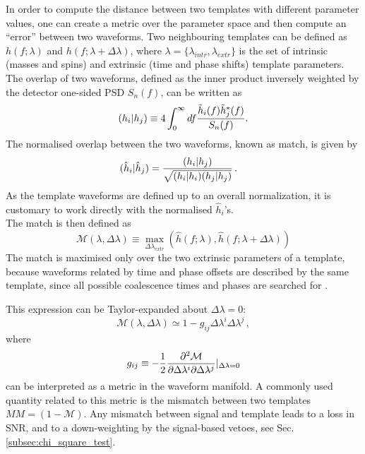 \documentclass[binding=0.6cm, LaM]{sapthesis}
\begin{document}
	In order to compute the distance between two templates with different parameter values, 
	one can create a metric over the parameter space and then compute an ``error'' between two waveforms.
	Two neighbouring templates can be defined as $h(f;\lambda)$ and $h(f;\lambda + \Delta \lambda)$,
        where $\lambda = \{\lambda_{intr}, \lambda_{extr}\}$ is the set of
        intrinsic (masses and spins) and extrinsic (time and phase shifts) template parameters.
	The overlap of two waveforms, defined as the inner product inversely weighted by the detector one-sided  PSD $S_n(f)$, 
	can be written as  
        \begin{equation}
          (h_i| h_j)  \equiv 4 \int_{0}^{\infty} df {{\tilde h_i(f) \tilde h^*_j(f)} \over {S_n(f)}}.
        \end{equation}
	The normalised overlap between the two waveforms, known as match, is given by
        \begin{align}
          (\hat{h}_i|\hat{h}_j)& = {{(h_i|h_j)} \over {\sqrt{(h_i| h_i)(h_j| h_j)}}}\,.
        \end{align}
	As the template waveforms are defined up to an overall normalization, 
	it is customary to work directly with the normalised $\hat{h}_i$'s. \\
	The match is then defined as
        \begin{equation}
          \mathcal{M}(\lambda, \Delta \lambda) \equiv \max_{\Delta \lambda_{extr}} (\hat h(f;\lambda), \hat h(f;\lambda + \Delta \lambda))
        \end{equation}
	The match is maximised only over the two extrinsic parameters of a template, 
	because waveforms related by time and phase offsets
	are described by the same template, 
	since all possible coalescence times and phases are searched for \cite{29}.

	This expression can be Taylor-expanded about $\Delta \lambda = 0$:
        \begin{equation}
          \mathcal{M}(\lambda, \Delta \lambda) \simeq 1 - g_{ij} \Delta \lambda^i \Delta \lambda^j\,,
        \end{equation}
	where 
        \begin{equation}
          g_{ij} \equiv -{1 \over 2} {{\partial^2\mathcal{M}} \over {\partial  \Delta \lambda^i  \partial \Delta \lambda^j}}\vert_{\Delta \lambda = 0}
        \end{equation}
	can be interpreted as a metric in the waveform manifold.  A commonly used quantity related to this metric
	is the mismatch between two templates $MM = (1 − \mathcal{M})$.
	Any mismatch between signal and template leads to a loss in SNR, 
	and to a down-weighting by the signal-based vetoes, see Sec.\,\ref{subsec:chi_square_test}.
\end{document}
